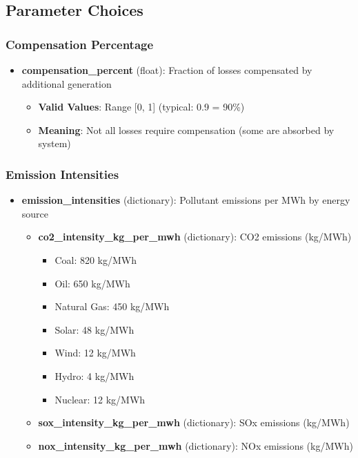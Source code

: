 \documentclass[ctcc_full_documentation.tex]{subfiles}
\begin{document}
\subsection{Parameter Choices}

\subsubsection{Compensation Percentage}

\begin{itemize}
    \item \textbf{compensation\_percent} (float): Fraction of losses compensated by additional generation
    \begin{itemize}
        \item \textbf{Valid Values}: Range [0, 1] (typical: 0.9 = 90\%)
        \item \textbf{Meaning}: Not all losses require compensation (some are absorbed by system)
    \end{itemize}
\end{itemize}

\subsubsection{Emission Intensities}

\begin{itemize}
    \item \textbf{emission\_intensities} (dictionary): Pollutant emissions per MWh by energy source
    \begin{itemize}
        \item \textbf{co2\_intensity\_kg\_per\_mwh} (dictionary): CO2 emissions (kg/MWh)
        \begin{itemize}
            \item Coal: 820 kg/MWh
            \item Oil: 650 kg/MWh
            \item Natural Gas: 450 kg/MWh
            \item Solar: 48 kg/MWh
            \item Wind: 12 kg/MWh
            \item Hydro: 4 kg/MWh
            \item Nuclear: 12 kg/MWh
        \end{itemize}
        \item \textbf{sox\_intensity\_kg\_per\_mwh} (dictionary): SOx emissions (kg/MWh)
        \item \textbf{nox\_intensity\_kg\_per\_mwh} (dictionary): NOx emissions (kg/MWh)
    \end{itemize}
\end{itemize}
\end{document}
